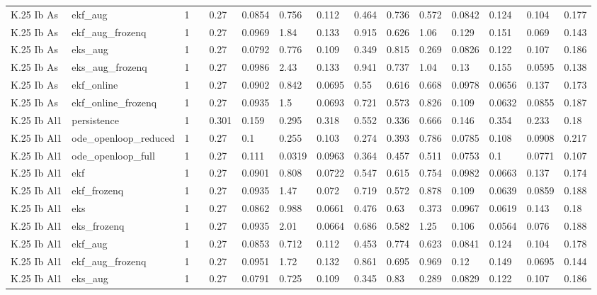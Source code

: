 \begin{table}[t]
\begin{tabular}{lllllllllllllll}
K.25 Ib As & ekf\_aug & 1 &  & 0.27 & 0.0854 & 0.756 & 0.112 & 0.464 & 0.736 & 0.572 & 0.0842 & 0.124 & 0.104 & 0.177 \\
K.25 Ib As & ekf\_aug\_frozenq & 1 &  & 0.27 & 0.0969 & 1.84 & 0.133 & 0.915 & 0.626 & 1.06 & 0.129 & 0.151 & 0.069 & 0.143 \\
K.25 Ib As & eks\_aug & 1 &  & 0.27 & 0.0792 & 0.776 & 0.109 & 0.349 & 0.815 & 0.269 & 0.0826 & 0.122 & 0.107 & 0.186 \\
K.25 Ib As & eks\_aug\_frozenq & 1 &  & 0.27 & 0.0986 & 2.43 & 0.133 & 0.941 & 0.737 & 1.04 & 0.13 & 0.155 & 0.0595 & 0.138 \\
K.25 Ib As & ekf\_online & 1 &  & 0.27 & 0.0902 & 0.842 & 0.0695 & 0.55 & 0.616 & 0.668 & 0.0978 & 0.0656 & 0.137 & 0.173 \\
K.25 Ib As & ekf\_online\_frozenq & 1 &  & 0.27 & 0.0935 & 1.5 & 0.0693 & 0.721 & 0.573 & 0.826 & 0.109 & 0.0632 & 0.0855 & 0.187 \\
K.25 Ib Al1 & persistence & 1 &  & 0.301 & 0.159 & 0.295 & 0.318 & 0.552 & 0.336 & 0.666 & 0.146 & 0.354 & 0.233 & 0.18 \\
K.25 Ib Al1 & ode\_openloop\_reduced & 1 &  & 0.27 & 0.1 & 0.255 & 0.103 & 0.274 & 0.393 & 0.786 & 0.0785 & 0.108 & 0.0908 & 0.217 \\
K.25 Ib Al1 & ode\_openloop\_full & 1 &  & 0.27 & 0.111 & 0.0319 & 0.0963 & 0.364 & 0.457 & 0.511 & 0.0753 & 0.1 & 0.0771 & 0.107 \\
K.25 Ib Al1 & ekf & 1 &  & 0.27 & 0.0901 & 0.808 & 0.0722 & 0.547 & 0.615 & 0.754 & 0.0982 & 0.0663 & 0.137 & 0.174 \\
K.25 Ib Al1 & ekf\_frozenq & 1 &  & 0.27 & 0.0935 & 1.47 & 0.072 & 0.719 & 0.572 & 0.878 & 0.109 & 0.0639 & 0.0859 & 0.188 \\
K.25 Ib Al1 & eks & 1 &  & 0.27 & 0.0862 & 0.988 & 0.0661 & 0.476 & 0.63 & 0.373 & 0.0967 & 0.0619 & 0.143 & 0.18 \\
K.25 Ib Al1 & eks\_frozenq & 1 &  & 0.27 & 0.0935 & 2.01 & 0.0664 & 0.686 & 0.582 & 1.25 & 0.106 & 0.0564 & 0.076 & 0.188 \\
K.25 Ib Al1 & ekf\_aug & 1 &  & 0.27 & 0.0853 & 0.712 & 0.112 & 0.453 & 0.774 & 0.623 & 0.0841 & 0.124 & 0.104 & 0.178 \\
K.25 Ib Al1 & ekf\_aug\_frozenq & 1 &  & 0.27 & 0.0951 & 1.72 & 0.132 & 0.861 & 0.695 & 0.969 & 0.12 & 0.149 & 0.0695 & 0.144 \\
K.25 Ib Al1 & eks\_aug & 1 &  & 0.27 & 0.0791 & 0.725 & 0.109 & 0.345 & 0.83 & 0.289 & 0.0829 & 0.122 & 0.107 & 0.186 \\

\end{tabular}
\end{table}
